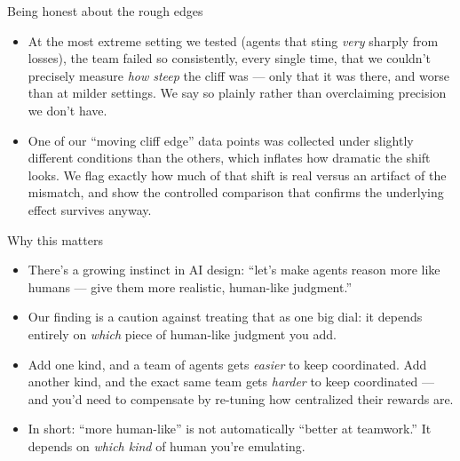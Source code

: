 \documentclass[aspectratio=169]{beamer}
\begin{document}
\begin{frame}{Being honest about the rough edges}
  \begin{itemize}
    \item At the most extreme setting we tested (agents that sting \emph{very} sharply from losses), the team failed so consistently, every single time, that we couldn't precisely measure \emph{how steep} the cliff was --- only that it was there, and worse than at milder settings. We say so plainly rather than overclaiming precision we don't have.
    \item One of our ``moving cliff edge'' data points was collected under slightly different conditions than the others, which inflates how dramatic the shift looks. We flag exactly how much of that shift is real versus an artifact of the mismatch, and show the controlled comparison that confirms the underlying effect survives anyway.
  \end{itemize}
\end{frame}

\begin{frame}{Why this matters}
  \begin{itemize}
    \item There's a growing instinct in AI design: ``let's make agents reason more like humans --- give them more realistic, human-like judgment.''
    \item Our finding is a caution against treating that as one big dial: \alert{it depends entirely on \emph{which} piece of human-like judgment you add.}
    \item Add one kind, and a team of agents gets \emph{easier} to keep coordinated. Add another kind, and the exact same team gets \emph{harder} to keep coordinated --- and you'd need to compensate by re-tuning how centralized their rewards are.
    \item In short: ``more human-like'' is not automatically ``better at teamwork.'' It depends on \emph{which kind} of human you're emulating.
  \end{itemize}
\end{frame}
\end{document}
